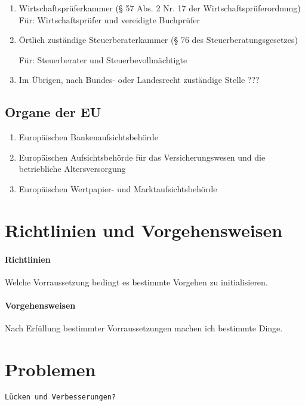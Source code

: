 \documentclass{article}
\begin{document}
\begin{enumerate}
                \item Wirtschaftsprüferkammer (§ 57 Abs. 2 Nr. 17 der Wirtschaftsprüferordnung)
                Für: Wirtschaftsprüfer und vereidigte Buchprüfer

                \item Örtlich zuständige Steuerberaterkammer (§ 76 des Steuerberatungsgesetzes)

                    Für: Steuerberater und Steuerbevollmächtigte

                \item Im Übrigen, nach Bundes- oder Landesrecht zuständige Stelle ???

            \end{enumerate}

        \subsection[Organe EU]{Organe der EU}

            \begin{enumerate}

                \item Europäischen Bankenaufsichtsbehörde 

                \item Europäischen Aufsichtsbehörde für das Versicherungswesen und die betriebliche Altersversorgung 

                \item Europäischen Wertpapier- und Marktaufsichtsbehörde 

            \end{enumerate}        


    \section[Richtlinien und Vorgehensweisen]{Richtlinien und Vorgehensweisen}

        \paragraph[Richtlinien]{Richtlinien}
            Welche Vorraussetzung bedingt es bestimmte Vorgehen zu initialisieren.

        \paragraph[Vorgehensweisen]{Vorgehensweisen}
            Nach Erfüllung bestimmter Vorraussetzungen machen ich bestimmte Dinge.

    \section[Probleme]{Problemen}

        \texttt{Lücken und Verbesserungen?}
\end{document}
